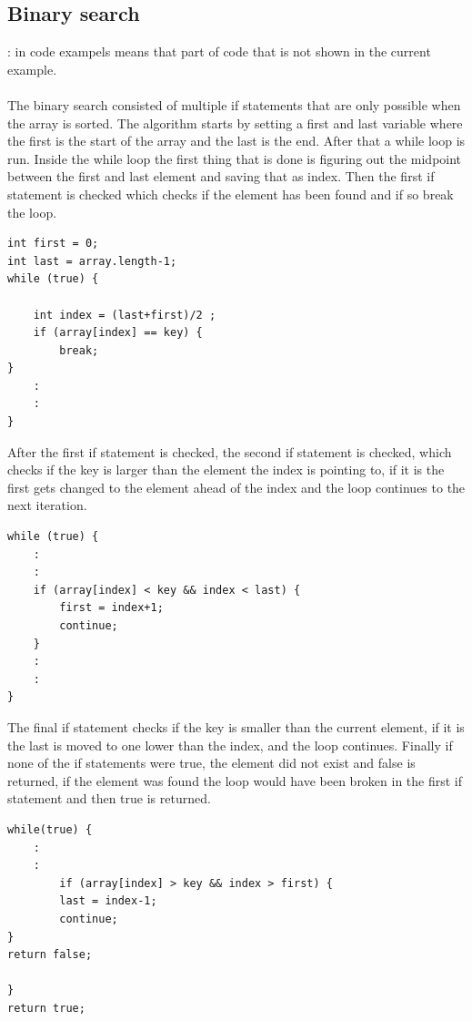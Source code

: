 \documentclass[a4paper,11pt]{article}
\begin{document}
\subsection*{Binary search}
: in code exampels means that part of code that is not shown in the current example.\\ \\
The binary search consisted of multiple if statements that are only possible when the array is sorted. The algorithm starts by setting 
a first and last variable where the first is the start of the array and the last is the end. After that a while loop is run. Inside the 
while loop the first thing that is done is figuring out the midpoint between the first and last element and saving that as index. Then the first
if statement is checked which checks if the element has been found and if so break the loop.
\begin{verbatim}
int first = 0;
int last = array.length-1;
while (true) {

    int index = (last+first)/2 ;
    if (array[index] == key) {
        break;
}
    :
    :
}
\end{verbatim}
After the first if statement is checked, the second if statement is checked, which checks if the key is larger than the element the index is pointing to,
if it is the first gets changed to the element ahead of the index and the loop continues to the next iteration.
\begin{verbatim}
while (true) {
    :
    :       
    if (array[index] < key && index < last) {
        first = index+1;
        continue;
    }
    :
    :
}
\end{verbatim}
The final if statement checks if the key is smaller than the current element, if it is the last is moved to one lower than the index, and the loop continues. Finally if none of the 
if statements were true, the element did not exist and false is returned, if the element was found the loop would have been broken in the first if statement and then true is returned.
\begin{verbatim}
while(true) {
    :
    :
        if (array[index] > key && index > first) {
        last = index-1;
        continue;
}
return false;

}
return true;  
\end{verbatim}
\end{document}
